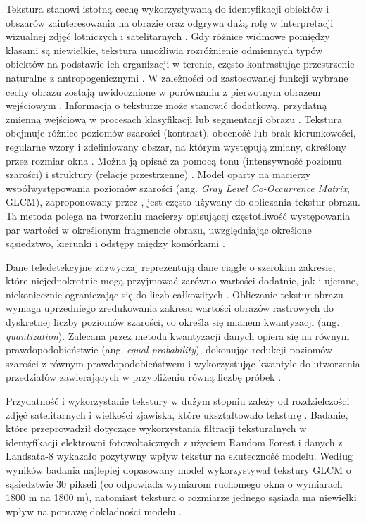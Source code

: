\documentclass{amuthesis}
\begin{document}
Tekstura stanowi istotną cechę wykorzystywaną do identyfikacji obiektów
i obszarów zainteresowania na obrazie \autocite{haralick_1973_texture}
oraz odgrywa dużą rolę w interpretacji wizualnej zdjęć lotniczych i
satelitarnych \autocite{lewinski_2012_texture}. Gdy różnice widmowe
pomiędzy klasami są niewielkie, tekstura umożliwia rozróżnienie
odmiennych typów obiektów na podstawie ich organizacji w terenie, często
kontrastując przestrzenie naturalne z antropogenicznymi
\autocite{grass_r_texture}. W zależności od zastosowanej funkcji wybrane
cechy obrazu zostają uwidocznione w porównaniu z pierwotnym obrazem
wejściowym \autocite{lewinski_2012_texture}. Informacja o teksturze może
stanowić dodatkową, przydatną zmienną wejściową w procesach klasyfikacji
lub segmentacji obrazu
\autocite{gong_1992_spatial_features,mumby_2002_ikonos}. Tekstura
obejmuje różnice poziomów szarości (kontrast), obecność lub brak
kierunkowości, regularne wzory i zdefiniowany obszar, na którym
występują zmiany, określony przez rozmiar okna
\autocite{hall_beyer_2017_glcm,grass_r_texture}. Można ją opisać za
pomocą tonu (intensywność poziomu szarości) i struktury (relacje
przestrzenne) \autocite{grass_r_texture}. Model oparty na macierzy
współwystępowania poziomów szarości (ang. \emph{Gray Level Co-Occurrence
Matrix}, GLCM), zaproponowany przez \textcite{haralick_1973_texture},
jest często używany do obliczania tekstur obrazu. Ta metoda polega na
tworzeniu macierzy opisującej częstotliwość występowania par wartości w
określonym fragmencie obrazu, uwzględniając określone sąsiedztwo,
kierunki i odstępy między komórkami \autocite{kupidura_2019_texture}.

Dane teledetekcyjne zazwyczaj reprezentują dane ciągłe o szerokim
zakresie, które niejednokrotnie mogą przyjmować zarówno wartości
dodatnie, jak i ujemne, niekoniecznie ograniczając się do liczb
całkowitych \autocite{R-GLCMTextures}. Obliczanie tekstur obrazu wymaga
uprzedniego zredukowania zakresu wartości obrazów rastrowych do
dyskretnej liczby poziomów szarości, co określa się mianem kwantyzacji
(ang. \emph{quantization}). Zalecana przez
\textcite{haralick_1973_texture} metoda kwantyzacji danych opiera się na
równym prawdopodobieństwie (ang. \emph{equal probability}), dokonując
redukcji poziomów szarości z równym prawdopodobieństwem i wykorzystując
kwantyle do utworzenia przedziałów zawierających w przybliżeniu równą
liczbę próbek \autocite{R-GLCMTextures}.

Przydatność i wykorzystanie tekstury w dużym stopniu zależy od
rozdzielczości zdjęć satelitarnych i wielkości zjawiska, które
ukształtowało teksturę \autocite{grass_r_texture}. Badanie, które
przeprowadził \textcite{zhang_2021_texture} dotyczące wykorzystania
filtracji teksturalnych w identyfikacji elektrowni fotowoltaicznych z
użyciem Random Forest i danych z Landsata-8 wykazało pozytywny wpływ
tekstur na skuteczność modelu. Według wyników badania najlepiej
dopasowany model wykorzystywał tekstury GLCM o sąsiedztwie 30 pikseli
(co odpowiada wymiarom ruchomego okna o wymiarach 1800 m na 1800 m),
natomiast tekstura o rozmiarze jednego sąsiada ma niewielki wpływ na
poprawę dokładności modelu \autocite{zhang_2021_texture}.
\end{document}
